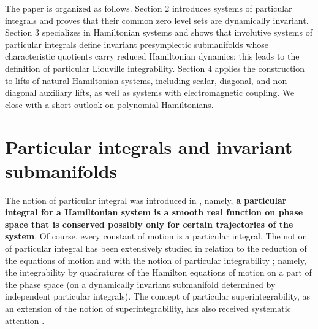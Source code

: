 \documentclass[10pt,a4paper]{article}
\begin{document}
The paper is organized as follows. Section 2 introduces systems of particular integrals and proves that their common zero level sets are dynamically invariant. Section 3 specializes in Hamiltonian systems and shows that involutive systems of particular integrals define invariant presymplectic submanifolds whose characteristic quotients carry reduced Hamiltonian dynamics; this leads to the definition of particular Liouville integrability. Section 4 applies the construction to lifts of natural Hamiltonian systems, including scalar, diagonal, and non-diagonal auxiliary lifts, as well as systems with electromagnetic coupling. We close with a short outlook on polynomial Hamiltonians.





\section{Particular integrals and invariant submanifolds}

The notion of particular integral was introduced in \cite{Turbiner2013}, namely, \textbf{a particular integral for a Hamiltonian system is a smooth real function on phase space that is conserved possibly only for certain trajectories of the system}. Of course, every constant of motion is a particular integral. The notion of particular integral has been extensively studied in relation to the reduction of the equations of motion and with the notion of particular integrability \cite{escobar2024particular,azuaje2025particular}; namely, the integrability by quadratures of the Hamilton equations of motion on a part of the phase space (on a dynamically invariant submanifold determined by independent particular integrals). The concept of particular superintegrability, as an extension of the notion of superintegrability, has also received systematic attention \cite{turbiner2020particular,turbiner2021superintegrability,escobar2026nonlinear}.
\end{document}
